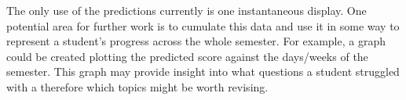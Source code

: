 The only use of the predictions currently is one instantaneous display. One potential area for further work is to cumulate this data and use it in some way to represent a student's progress across the whole semester. For example, a graph could be created plotting the predicted score against the days/weeks of the semester. This graph may provide insight into what questions a student struggled with a therefore which topics might be worth revising.
